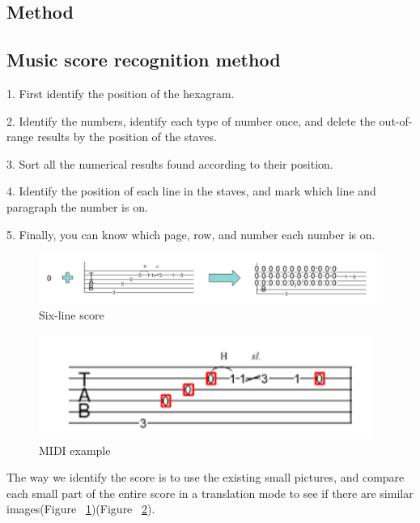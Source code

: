 \documentclass[10pt,twocolumn,letterpaper]{article}
\begin{document}
\begin{CJK}{UTF8}{bsmi}
\section{Method}

\subsection{Music score recognition method}
\begin{description}
\item 1. First identify the position of the hexagram.
\item 2. Identify the numbers, identify each type of number once, and delete the out-of-range results by the position of the staves.
\item 3. Sort all the numerical results found according to their position.
\item 4. Identify the position of each line in the staves, and mark which line and paragraph the number is on.
\item 5. Finally, you can know which page, row, and number each number is on.
\end{description}


\begin{figure}[t]
\begin{center}
   \includegraphics[width=0.8\linewidth]{method_1.png}
\end{center}
   \caption{Six-line score}
\label{fig:method_1}
\end{figure}

\begin{figure}[t]
\begin{center}
   \includegraphics[width=0.8\linewidth]{method_2.png}
\end{center}
   \caption{MIDI example}
\label{fig:method_2}
\end{figure}


The way we identify the score is to use the existing small pictures, and compare each small part of the entire score in a translation mode to see if there are similar images(Figure ~\ref{fig:method_1})(Figure ~\ref{fig:method_2}).


\end{CJK}
\end{document}

